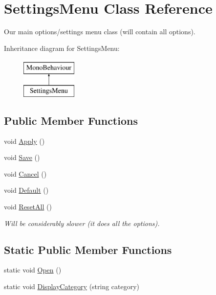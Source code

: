 \hypertarget{class_settings_menu}{}\section{Settings\+Menu Class Reference}
\label{class_settings_menu}


Our main options/settings menu class (will contain all options).  


Inheritance diagram for Settings\+Menu\+:\begin{figure}[H]
\begin{center}
\leavevmode
\includegraphics[height=2.000000cm]{class_settings_menu}
\end{center}
\end{figure}
\subsection*{Public Member Functions}
\begin{DoxyCompactItemize}
\item 
void \hyperlink{class_settings_menu_ac3618fb688293045ea9a39f8c5f0bc48}{Apply} ()
\item 
void \hyperlink{class_settings_menu_a0c16f016731747c6cdbfe6f45cdfa8e9}{Save} ()
\item 
void \hyperlink{class_settings_menu_a0a582f46170a8f49524622aad9adbafa}{Cancel} ()
\item 
void \hyperlink{class_settings_menu_aacc7ff5721b45cef7758564fea7b3b66}{Default} ()
\item 
void \hyperlink{class_settings_menu_a40e5c0326770a9ba25d011a2414ae4e1}{Reset\+All} ()
\begin{DoxyCompactList}\small\item\em Will be considerably slower (it does all the options). \end{DoxyCompactList}\end{DoxyCompactItemize}
\subsection*{Static Public Member Functions}
\begin{DoxyCompactItemize}
\item 
static void \hyperlink{class_settings_menu_adce810e9892af509032afe3abd35c69a}{Open} ()
\item 
static void \hyperlink{class_settings_menu_a9699b74ea6b8a8be066044d0b34f4ab0}{Display\+Category} (string category)
\end{DoxyCompactItemize}



